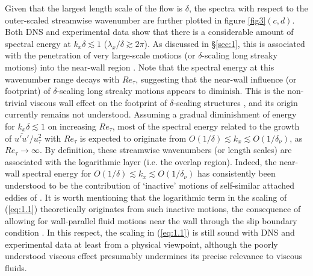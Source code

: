 \documentclass{jfm}
\begin{document}
Given that the largest length scale of the flow is $\delta$, the spectra with respect to the outer-scaled streamwise wavenumber are further plotted in figure \ref{fig3}$(c,d)$. Both DNS and experimental data show that there is a considerable amount of spectral energy at $k_x\delta \lesssim 1$ ($\lambda_x/\delta \gtrsim 2\pi$). As discussed in \S\ref{sec:1}, this is associated with the penetration of very large-scale motions (or $\delta$-scaling long streaky motions) into the near-wall region \cite[e.g.][]{Hutchins2007,Mathis2009,Mathis2013,Duvvuri2015,Agostini2016,Zhang2016}. Note that the spectral energy at this wavenumber range decays with $Re_\tau$, suggesting that the near-wall influence (or footprint) of $\delta$-scaling long streaky motions appears to diminish. This is the non-trivial viscous wall effect on the footprint of $\delta$-scaling structures \cite[]{Hwang2016c}, and its origin currently remains not understood. Assuming a gradual diminishment of energy for $k_x\delta \lesssim 1$ on increasing $Re_\tau$, most of the spectral energy related to the growth of $\overline{u'u'}/u_\tau^2$ with $Re_\tau$ is expected to originate from $O(1/\delta)\lesssim k_x \lesssim O(1/\delta_\nu)$, as $Re_\tau \rightarrow \infty$. By definition, these streamwise wavenumbers (or length scales) are associated with the logarithmic layer (i.e. the overlap region). Indeed, the near-wall spectral energy for $O(1/\delta)\lesssim k_x\lesssim O(1/\delta_\nu)$ has consistently been understood to be the contribution of `inactive' motions of self-similar attached eddies of \cite{Townsend1976} \cite[for a detailed discussion, see also][]{Hwang2015,Hwang2016c,Deshpande2020,Holford2023a}. It is worth mentioning that the logarithmic term in the scaling of (\ref{eq:1.1}) theoretically originates from such inactive motions, the consequence of allowing for wall-parallel fluid motions near the wall through the slip boundary condition \cite[]{Townsend1976}. In this respect, the scaling in (\ref{eq:1.1}) is still sound with DNS and experimental data at least from a physical viewpoint, although the poorly understood viscous effect presumably undermines its precise relevance to viscous fluids. %
\end{document}
